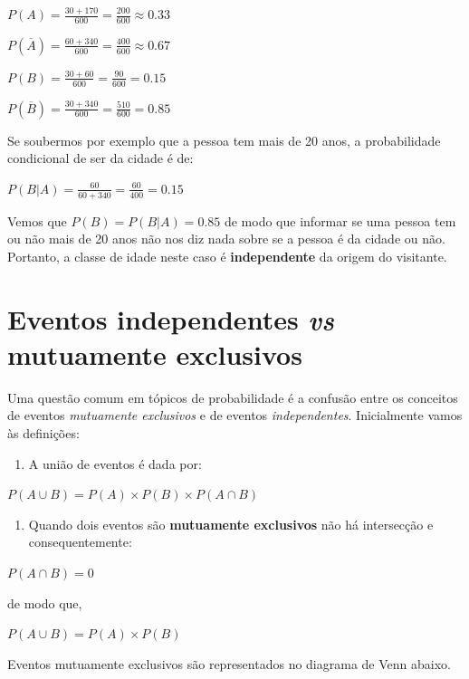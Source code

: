 \documentclass[
]{book}
\providecommand{\tightlist}{%
  \setlength{\itemsep}{0pt}\setlength{\parskip}{0pt}}
\begin{document}
\(P(A) = \frac{30 + 170}{600} = \frac{200}{600} \approx 0.33\)

\(P(\overline{A}) = \frac{60 + 340}{600} = \frac{400}{600} \approx 0.67\)

\(P(B) = \frac{30 + 60}{600} = \frac{90}{600} = 0.15\)

\(P(\overline{B}) = \frac{30 + 340}{600} = \frac{510}{600} = 0.85\)

Se soubermos por exemplo que a pessoa tem mais de 20 anos, a probabilidade condicional de ser da cidade é de:

\(P(B|A) = \frac{60}{60 + 340} = \frac{60}{400} = 0.15\)

Vemos que \(P(B) = P(B|A) = 0.85\) de modo que informar se uma pessoa tem ou não mais de 20 anos não nos diz nada sobre se a pessoa é da cidade ou não. Portanto, a classe de idade neste caso é \textbf{independente} da origem do visitante.

\hypertarget{eventos-independentes-vs-mutuamente-exclusivos}{%
\section{\texorpdfstring{Eventos independentes \emph{vs} mutuamente exclusivos}{Eventos independentes vs mutuamente exclusivos}}\label{eventos-independentes-vs-mutuamente-exclusivos}}

Uma questão comum em tópicos de probabilidade é a confusão entre os conceitos de eventos \emph{mutuamente exclusivos} e de eventos \emph{independentes}. Inicialmente vamos às definições:

\begin{enumerate}
\def\labelenumi{\arabic{enumi}.}
\tightlist
\item
  A união de eventos é dada por:
\end{enumerate}

\(P(A \cup B) = P(A) \times P(B) \times P(A \cap B)\)

\begin{enumerate}
\def\labelenumi{\arabic{enumi}.}
\setcounter{enumi}{1}
\tightlist
\item
  Quando dois eventos são \textbf{mutuamente exclusivos} não há intersecção e consequentemente:
\end{enumerate}

\(P(A \cap B) = 0\)

de modo que,

\(P(A \cup B) = P(A) \times P(B)\)

Eventos mutuamente exclusivos são representados no diagrama de Venn abaixo.
\end{document}
